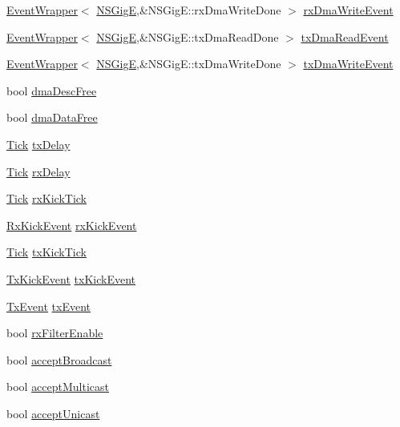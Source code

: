 \begin{DoxyCompactItemize}
\item 
\hyperlink{classEventWrapper}{EventWrapper}$<$ \hyperlink{classNSGigE}{NSGigE},\&NSGigE::rxDmaWriteDone $>$ \hyperlink{classNSGigE_a6a23fd3bead30e970d3408878ab65300}{rxDmaWriteEvent}
\item 
\hyperlink{classEventWrapper}{EventWrapper}$<$ \hyperlink{classNSGigE}{NSGigE},\&NSGigE::txDmaReadDone $>$ \hyperlink{classNSGigE_a807712f075f68d20468d8bfd5c2683eb}{txDmaReadEvent}
\item 
\hyperlink{classEventWrapper}{EventWrapper}$<$ \hyperlink{classNSGigE}{NSGigE},\&NSGigE::txDmaWriteDone $>$ \hyperlink{classNSGigE_a4b6694e9bda6524d3be9c4a0455e9092}{txDmaWriteEvent}
\item 
bool \hyperlink{classNSGigE_a761ebca4730cef2f17c0d126c0f4021e}{dmaDescFree}
\item 
bool \hyperlink{classNSGigE_a2bf59b06438e03a53e9e4cb4a03d5d77}{dmaDataFree}
\item 
\hyperlink{base_2types_8hh_a5c8ed81b7d238c9083e1037ba6d61643}{Tick} \hyperlink{classNSGigE_a58f95130ec6a9f1aa53164dda8092a4c}{txDelay}
\item 
\hyperlink{base_2types_8hh_a5c8ed81b7d238c9083e1037ba6d61643}{Tick} \hyperlink{classNSGigE_a6cc267606cd392ef073394a9464c9c19}{rxDelay}
\item 
\hyperlink{base_2types_8hh_a5c8ed81b7d238c9083e1037ba6d61643}{Tick} \hyperlink{classNSGigE_aa36d466a86f77d2c7afdc014e3a6f8b3}{rxKickTick}
\item 
\hyperlink{classEventWrapper}{RxKickEvent} \hyperlink{classNSGigE_a3fbd0c19b8572f83e05e110cab0377e6}{rxKickEvent}
\item 
\hyperlink{base_2types_8hh_a5c8ed81b7d238c9083e1037ba6d61643}{Tick} \hyperlink{classNSGigE_acfce4fae6fa03f94e3d91d71302fe349}{txKickTick}
\item 
\hyperlink{classEventWrapper}{TxKickEvent} \hyperlink{classNSGigE_aa7f11fd6eeb10e55cdbc1a019f180fcc}{txKickEvent}
\item 
\hyperlink{classEventWrapper}{TxEvent} \hyperlink{classNSGigE_a324fed072a29716c20a98a82927bd2a2}{txEvent}
\item 
bool \hyperlink{classNSGigE_a28bf0d48378988af71cb8816e7563098}{rxFilterEnable}
\item 
bool \hyperlink{classNSGigE_acfb14322b6789710b0624c6a5d0a054d}{acceptBroadcast}
\item 
bool \hyperlink{classNSGigE_a579510b3b61efdff3a00db2f30dee6b2}{acceptMulticast}
\item 
bool \hyperlink{classNSGigE_ad63c60252439fc0ecc49bc72cd728095}{acceptUnicast}

\end{DoxyCompactItemize}
